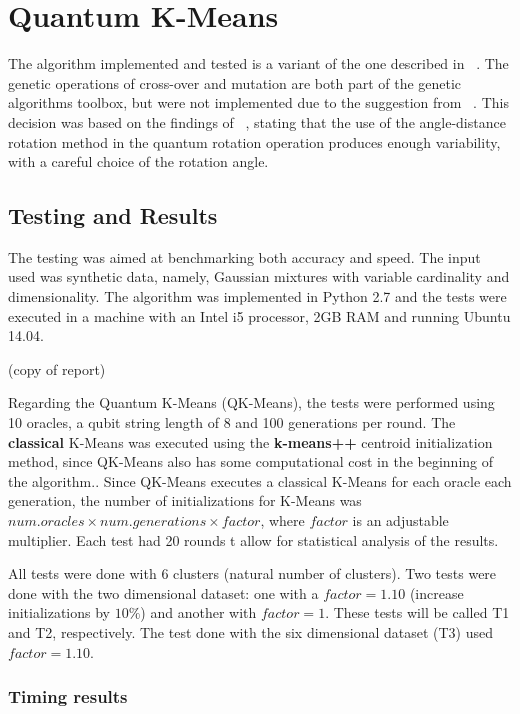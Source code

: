 
\section{Quantum K-Means}


The algorithm implemented and tested is a variant of the one described in ~\cite{Casper}. The genetic operations of cross-over and mutation are both part of the genetic algorithms toolbox, but were not implemented due to the suggestion from ~\cite{Wiebe2014}. This decision was based on the findings of ~\cite{Liu2010}, stating that the use of the angle-distance rotation method in the quantum rotation operation produces enough variability, with a careful choice of the rotation angle.

\subsection{Testing and Results}
The testing was aimed at benchmarking both accuracy and speed. The input used was synthetic data, namely, Gaussian mixtures with variable cardinality and dimensionality. The algorithm was implemented in Python 2.7 and the tests were executed in a machine with an Intel i5 processor, 2GB RAM and running Ubuntu 14.04.

(copy of report)

Regarding the Quantum K-Means (QK-Means), the tests were performed using 10 oracles, a qubit string length of 8 and 100 generations per round. The \textbf{classical} K-Means was executed using the \textbf{k-means++} centroid initialization method, since QK-Means also has some computational cost in the beginning of the algorithm.. Since QK-Means executes a classical K-Means for each oracle each generation, the number of initializations for K-Means was $num.oracles \times num.generations \times factor$, where $factor$ is an adjustable multiplier. Each test had 20 rounds t allow for statistical analysis of the results.

All tests were done with 6 clusters (natural number of clusters). Two tests were done with the two dimensional dataset: one with a $factor=1.10$ (increase initializations by $10\%$) and another with $factor=1$. These tests will be called T1 and T2, respectively. The test done with the six dimensional dataset (T3) used $factor=1.10$.

\subsubsection{Timing results}


